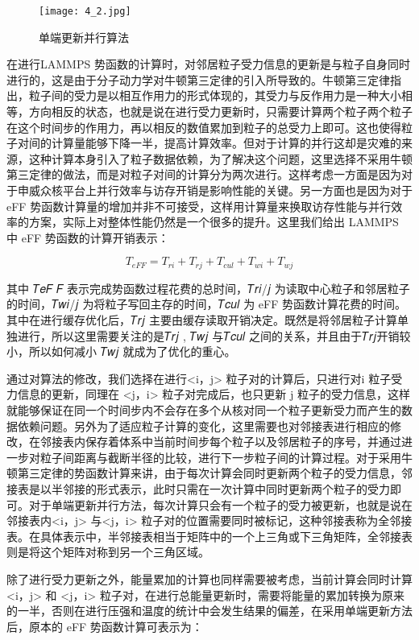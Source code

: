  \begin{figure}[h]
  \centering
  \texttt{[image: 4\_2.jpg]}
  \caption{单端更新并行算法}
\end{figure}

 在进行LAMMPS 势函数的计算时，对邻居粒子受力信息的更新是与粒子自身同时进行的，这是由于分子动力学对牛顿第三定律的引入所导致的。牛顿第三定律指出，粒子间的受力是以相互作用力的形式体现的，其受力与反作用力是一种大小相等，方向相反的状态，也就是说在进行受力更新时，只需要计算两个粒子两个粒子在这个时间步的作用力，再以相反的数值累加到粒子的总受力上即可。这也使得粒子对间的计算量能够下降一半，提高计算效率。但对于计算的并行这却是灾难的来源，这种计算本身引入了粒子数据依赖，为了解决这个问题，这里选择不采用牛顿第三定律的做法，而是对粒子对间的计算分为两次进行。这样考虑一方面是因为对于申威众核平台上并行效率与访存开销是影响性能的关键。另一方面也是因为对于eFF 势函数计算量的增加并非不可接受，这样用计算量来换取访存性能与并行效率的方案，实际上对整体性能仍然是一个很多的提升。这里我们给出 LAMMPS 中 eFF 势函数的计算开销表示：

 \begin{equation}
   T_{eFF}=T_{ri}+T_{rj}+T_{cul}+T_{wi}+T_{wj}
 \end{equation}

其中 𝑇𝑒𝐹 𝐹 表示完成势函数过程花费的总时间，𝑇𝑟𝑖/𝑗 为读取中心粒子和邻居粒子的时间，𝑇𝑤𝑖/𝑗 为将粒子写回主存的时间，𝑇𝑐𝑢𝑙 为 eFF 势函数计算花费的时间。其中在进行缓存优化后，𝑇𝑟𝑗 主要由缓存读取开销决定。既然是将邻居粒子计算单独进行，所以这里需要关注的是𝑇𝑟𝑗 , 𝑇𝑤𝑗 与𝑇𝑐𝑢𝑙 之间的关系，并且由于𝑇𝑟𝑗开销较小，所以如何减小 𝑇𝑤𝑗 就成为了优化的重心。

通过对算法的修改，我们选择在进行<i，j> 粒子对的计算后，只进行对i 粒子受力信息的更新，同理在 <j，i> 粒子对完成后，也只更新 j 粒子的受力信息，这样就能够保证在同一个时间步内不会存在多个从核对同一个粒子更新受力而产生的数据依赖问题。另外为了适应粒子计算的变化，这里需要也对邻接表进行相应的修改，在邻接表内保存着体系中当前时间步每个粒子以及邻居粒子的序号，并通过进一步对粒子间距离与截断半径的比较，进行下一步粒子间的计算过程。对于采用牛顿第三定律的势函数计算来讲，由于每次计算会同时更新两个粒子的受力信息，邻接表是以半邻接的形式表示，此时只需在一次计算中同时更新两个粒子的受力即可。对于单端更新并行方法，每次计算只会有一个粒子的受力被更新，也就是说在邻接表内<i，j> 与<j，i> 粒子对的位置需要同时被标记，这种邻接表称为全邻接表。在具体表示中，半邻接表相当于矩阵中的一个上三角或下三角矩阵，全邻接表则是将这个矩阵对称到另一个三角区域。

除了进行受力更新之外，能量累加的计算也同样需要被考虑，当前计算会同时计算 <i，j> 和 <j，i> 粒子对，在进行总能量更新时，需要将能量的累加转换为原来的一半，否则在进行压强和温度的统计中会发生结果的偏差，在采用单端更新方法后，原本的 eFF 势函数计算可表示为：

